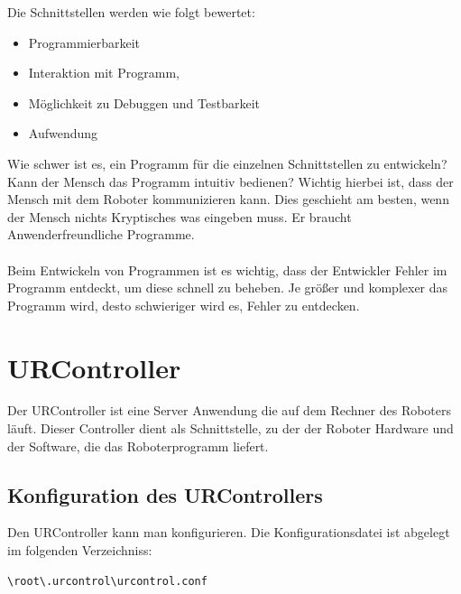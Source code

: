Die Schnittstellen werden wie folgt bewertet:

\begin{itemize}
\item Programmierbarkeit
\item Interaktion mit Programm,
\item Möglichkeit zu Debuggen und Testbarkeit
\item Aufwendung
\end{itemize}

Wie schwer ist es, ein Programm für die einzelnen Schnittstellen zu entwickeln?
Kann der Mensch das Programm intuitiv bedienen? Wichtig hierbei ist, dass der Mensch mit dem Roboter kommunizieren kann. Dies geschieht am besten, wenn der Mensch nichts Kryptisches was eingeben muss. Er braucht Anwenderfreundliche Programme.
\\\\
Beim Entwickeln von Programmen ist es wichtig, dass der Entwickler Fehler im Programm entdeckt, um diese schnell zu beheben.
Je größer und komplexer das Programm wird, desto schwieriger wird es, Fehler zu entdecken. 

\section{URController}
\label{sec:ur_control_gru}

Der URController ist eine Server Anwendung die auf dem Rechner des Roboters läuft. 
Dieser Controller dient als Schnittstelle, zu der der Roboter Hardware und der Software, die das Roboterprogramm liefert. 

\subsection{Konfiguration des URControllers}
\label{urcontrol_rci_gru}

Den URController kann man konfigurieren. Die Konfigurationsdatei ist abgelegt im folgenden Verzeichniss:
\begin{lstlisting}
\root\.urcontrol\urcontrol.conf
\end{lstlisting}

